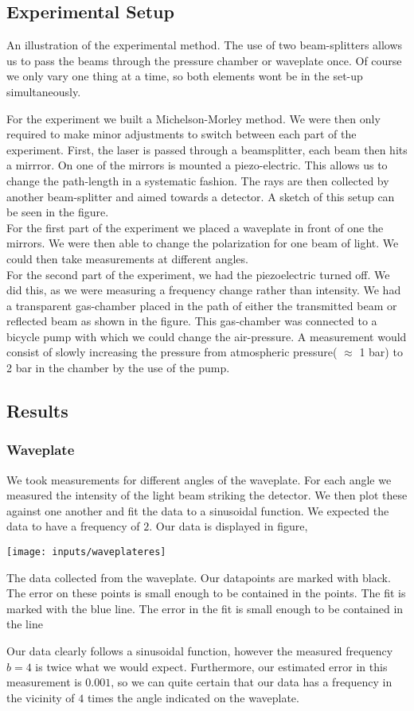 \documentclass[working, oneside]{inputs/tuftebook}
\begin{document}
\subsection*{Experimental Setup}
\begin{marginfigure}[-50pt]
	\centering
	\caption{An illustration of the experimental method. The use of two beam-splitters allows us to pass the beams through the pressure chamber or waveplate once. Of course we only vary one thing at a time, so both elements wont be in the set-up simultaneously.}
	\label{fig:}
\end{marginfigure}
For the experiment we built a Michelson-Morley method. We were then only required to make minor adjustments to switch between each part of the experiment. First, the laser is passed through a beamsplitter, each beam then hits a mirrror. On one of the mirrors is mounted a piezo-electric. This allows us to change the path-length in a systematic fashion. The rays are then collected by another beam-splitter and aimed towards a detector. A sketch of this setup can be seen in the figure. \\
For the first part of the experiment we placed a waveplate in front of one the mirrors. We were then able to change the polarization for one beam of light. We could then take measurements at different angles. 
\\
For the second part of the experiment, we had the piezoelectric turned off. We did this, as we were measuring a frequency change rather than intensity. We had a transparent gas-chamber placed in the path of either the transmitted beam or reflected beam as shown in the figure. This gas-chamber was connected to a bicycle pump with which we could change the air-pressure. A measurement would consist of slowly increasing the pressure from atmospheric pressure( $\approx$ 1 bar) to 2 bar in the chamber by the use of the pump. 
\subsection*{Results}
\subsubsection*{Waveplate}
We took measurements for different angles of the waveplate. For each angle we measured the intensity of the light beam striking the detector. We then plot these against one another and fit the data to a sinusoidal function. We expected the data to have a frequency of $2$. Our data is displayed in figure,
\begin{marginfigure}[-25pt]
	\centering
	\texttt{[image: inputs/waveplateres]}
	\caption{The data collected from the waveplate. Our datapoints are marked with black. The error on these points is small enough to be contained in the points. The fit is marked with the blue line. The error in the fit is small enough to be contained in the line}
\end{marginfigure}
Our data clearly follows a sinusoidal function, however the measured frequency $b = 4$ is twice what we would expect. Furthermore, our estimated error in this measurement is $0.001$, so we can quite certain that our data has a frequency in the vicinity of $4$ times the angle indicated on the waveplate.
\end{document}
